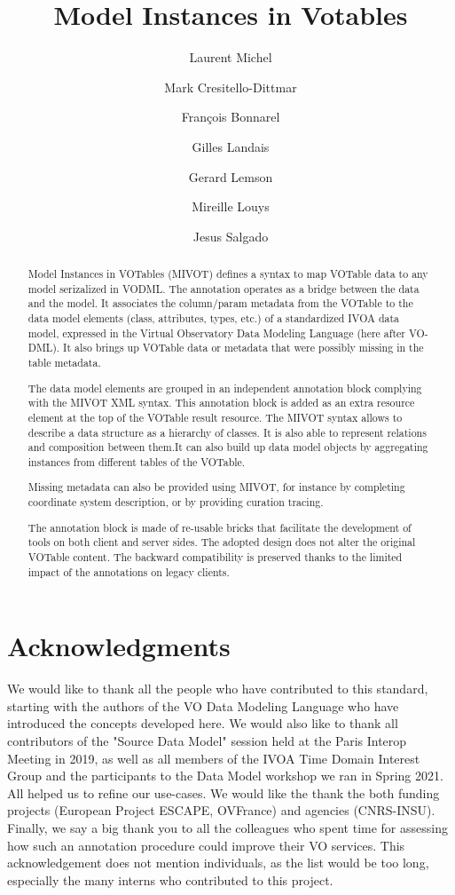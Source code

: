 \documentclass[11pt,a4paper]{ivoa}
\title{Model Instances in Votables}
\author{Laurent Michel}
\author{Mark Cresitello-Dittmar}
\author{François Bonnarel}
\author{Gilles Landais}
\author{Gerard Lemson}
\author{Mireille Louys}
\author{Jesus Salgado}
\begin{document}
\begin{abstract}
Model Instances in VOTables (MIVOT) defines a syntax to map VOTable data to any model serizalized in VODML.
The annotation operates as a bridge between the data and the model.
It associates the column/param metadata from the VOTable to the 
data model elements (class, attributes, types, etc.) of a standardized IVOA data model, expressed in the Virtual Observatory Data Modeling Language (here after VO-DML).
It also brings up VOTable data or metadata that were possibly missing in the table metadata.

The data model elements are grouped in an independent annotation block complying with the MIVOT XML syntax.
This annotation block is added as an extra resource element at the top of the VOTable result resource. 
The MIVOT syntax allows to describe a data structure as a hierarchy of classes. It is also able to represent relations and composition between them.It can also build up data model objects by aggregating instances from different tables of the VOTable.

Missing metadata can also be provided using MIVOT, for instance by completing coordinate system description, or by providing curation tracing.

The annotation block is made of re-usable bricks that facilitate the development of tools on both client and server sides.
The adopted design does not alter the original VOTable content. 
The backward compatibility is preserved thanks to the limited impact of the annotations on legacy clients.
\end{abstract}


\section*{Acknowledgments}
We would like to thank all the people who have contributed to this standard, starting with the authors of the VO Data Modeling Language who have introduced the concepts developed here.
We would also like to thank all contributors of the "Source Data Model" session held at the Paris Interop Meeting in 2019, as well as all members of the IVOA Time Domain Interest Group and the participants to the Data Model workshop we ran in Spring 2021. All helped us to refine our use-cases.
We would like the thank the both funding projects (European Project ESCAPE, OVFrance) and agencies (CNRS-INSU).
Finally, we say a big thank you to all the colleagues who spent time for assessing how such an annotation procedure could improve their VO services.
This acknowledgement does not mention individuals, as the list would be too long, especially the many interns who contributed to this project.
\end{document}
